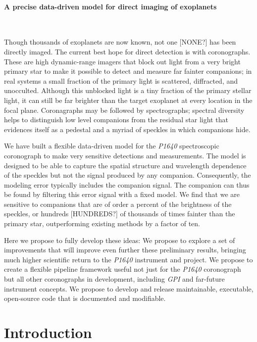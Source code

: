 \documentclass[12pt,pdftex,preprint]{aastex}
\newcommand{\project}[1]{\textsl{#1}}
\begin{document}
\paragraph{A precise data-driven model for direct imaging of exoplanets}~

Though thousands of exoplanets are now known, not one [NONE?] has been
directly imaged.  The current best hope for direct detection is with
coronographs.  These are high dynamic-range imagers that block out
light from a very bright primary star to make it possible to detect
and measure far fainter companions; in real systems a small fraction
of the primary light is scattered, diffracted, and unocculted.
Although this unblocked light is a tiny fraction of the primary
stellar light, it can still be far brighter than the target exoplanet
at every location in the focal plane.  Coronagraphs may be followed by
spectrographs; spectral diversity helps to distinguish low level
companions from the residual star light that evidences itself as a
pedestal and a myriad of speckles in which companions hide.

We have built a flexible data-driven model for the \project{P1640}
spectroscopic coronograph to make very sensitive detections and
measurements.  The model is designed to be able to capture the spatial
structure and wavelength dependence of the speckles but not the signal
produced by any companion. Consequently, the modeling error typically
includes the companion signal. The companion can thus be found by
filtering this error signal with a fixed model.  We find that we are
sensitive to companions that are of order a percent of the brightness
of the speckles, or hundreds [HUNDREDS?] of thousands of times fainter
than the primary star, outperforming existing methods by a factor of
ten.

Here we propose to fully develop these ideas: We propose to explore a
set of improvements that will improve even further these preliminary
results, bringing much higher scientific return to the \project{P1640}
instrument and project.  We propose to create a flexible pipeline
framework useful not just for the \project{P1640} coronograph but all
other coronographs in development, including \project{GPI} and
far-future instrument concepts.  We propose to develop and release
maintainable, executable, open-source code that is documented and
modifiable.

\clearpage
\section{Introduction}
\end{document}

